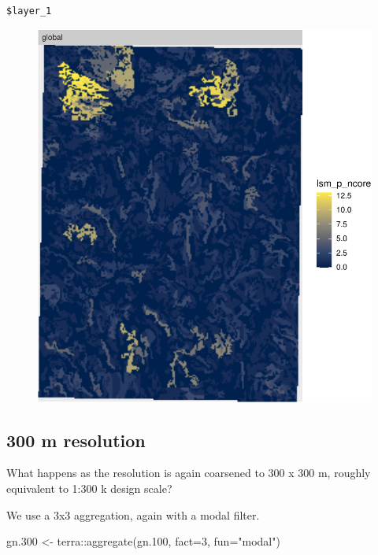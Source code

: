 \documentclass[
  letterpaper,
  DIV=11,
  numbers=noendperiod]{scrartcl}
\newenvironment{Shaded}{\begin{snugshade}}{\end{snugshade}}
\newcommand{\AttributeTok}[1]{\textcolor[rgb]{0.40,0.45,0.13}{#1}}
\newcommand{\DecValTok}[1]{\textcolor[rgb]{0.68,0.00,0.00}{#1}}
\newcommand{\FloatTok}[1]{\textcolor[rgb]{0.68,0.00,0.00}{#1}}
\newcommand{\FunctionTok}[1]{\textcolor[rgb]{0.28,0.35,0.67}{#1}}
\newcommand{\NormalTok}[1]{\textcolor[rgb]{0.00,0.23,0.31}{#1}}
\newcommand{\OtherTok}[1]{\textcolor[rgb]{0.00,0.23,0.31}{#1}}
\newcommand{\SpecialCharTok}[1]{\textcolor[rgb]{0.37,0.37,0.37}{#1}}
\newcommand{\StringTok}[1]{\textcolor[rgb]{0.13,0.47,0.30}{#1}}
\begin{document}
\begin{verbatim}
$layer_1
\end{verbatim}

\begin{figure}[H]

{\centering \includegraphics{PatternAnalysisWorkshopTutorial_files/figure-pdf/show-ncore-100-1.pdf}

}

\end{figure}

\hypertarget{m-resolution-2}{%
\subsection{300 m resolution}\label{m-resolution-2}}

What happens as the resolution is again coarsened to 300 x 300 m,
roughly equivalent to 1:300 k design scale?

We use a 3x3 aggregation, again with a modal filter.

\begin{Shaded}
\begin{Highlighting}[]
\NormalTok{gn}\FloatTok{.300} \OtherTok{\textless{}{-}}\NormalTok{ terra}\SpecialCharTok{::}\FunctionTok{aggregate}\NormalTok{(gn}\FloatTok{.100}\NormalTok{, }\AttributeTok{fact=}\DecValTok{3}\NormalTok{, }\AttributeTok{fun=}\StringTok{"modal"}\NormalTok{)}
\end{Highlighting}
\end{Shaded}
\end{document}
